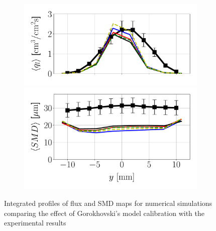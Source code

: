 \begin{figure}[t!]
\begin{subfigure}[b]{0.2\textwidth}
\end{subfigure}
\hspace*{0.1in}
\begin{subfigure}[b]{0.4\textwidth}
	\flushleft
   \includegraphics[scale=0.35]{./part2_developments/figures_ch6_lagrangian_JICF/apte_model_calibration_u_vw_lognorm/profiles/flux_along_y}\\
   \vspace{-0.16in}
   \includegraphics[scale=0.35]{./part2_developments/figures_ch6_lagrangian_JICF/apte_model_calibration_u_vw_lognorm/profiles/SMD_along_y}
\end{subfigure}

\caption{Integrated profiles of flux and SMD maps for numerical simulations comparing the effect of Gorokhovski's model calibration with the experimental results}
\label{fig:profiles_LGS_JICF_apte_calibration}
\end{figure}

